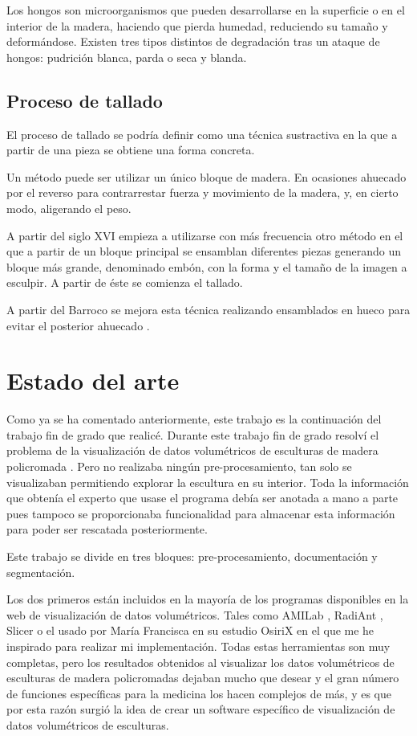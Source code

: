 Los hongos son microorganismos que pueden desarrollarse en la superficie o en el interior de la madera, haciendo que pierda humedad, reduciendo su tamaño y deformándose. Existen tres tipos distintos de degradación tras un ataque de hongos: pudrición blanca, parda o seca y blanda.

\subsection{Proceso de tallado}

El proceso de tallado se podría definir como una técnica sustractiva en la que a partir de una pieza se obtiene una forma concreta.

Un método puede ser utilizar un único bloque de madera. En ocasiones ahuecado por el reverso para contrarrestar fuerza y movimiento de la madera, y, en cierto modo, aligerando el peso.

A partir del siglo XVI empieza a utilizarse con más frecuencia otro método en el que a partir de un bloque principal se ensamblan diferentes piezas generando un bloque más grande, denominado embón, con la forma y el tamaño de la imagen a esculpir. A partir de éste se comienza el tallado.

A partir del Barroco se mejora esta técnica realizando ensamblados en hueco para evitar el posterior ahuecado \cite{sarrio16}.

\section{Estado del arte}

Como ya se ha comentado anteriormente, este trabajo es la continuación del trabajo fin de grado que realicé. Durante este trabajo fin de grado resolví el problema de la visualización de datos volumétricos de esculturas de madera policromada \cite{bolivar16}. Pero no realizaba ningún pre-procesamiento, tan solo se visualizaban permitiendo explorar la escultura en su interior. Toda la información que obtenía el experto que usase el programa debía ser anotada a mano a parte pues tampoco se proporcionaba funcionalidad para almacenar esta información para poder ser rescatada posteriormente.

Este trabajo se divide en tres bloques: pre-procesamiento, documentación y segmentación. 

Los dos primeros están incluidos en la mayoría de los programas disponibles en la web de visualización de datos volumétricos. Tales como AMILab \cite{krissian12}, RadiAnt \cite{radiant}, Slicer \cite{fedorov12} o el usado por María Francisca en su estudio \cite{sarrio16} OsiriX \cite{rosset04} en el que me he inspirado para realizar mi implementación. Todas estas herramientas son muy completas, pero los resultados obtenidos al visualizar los datos volumétricos de esculturas de madera policromadas dejaban mucho que desear y el gran número de funciones específicas para la medicina los hacen complejos de más, y es que por esta razón surgió la idea de crear un software específico de visualización de datos volumétricos de esculturas.

